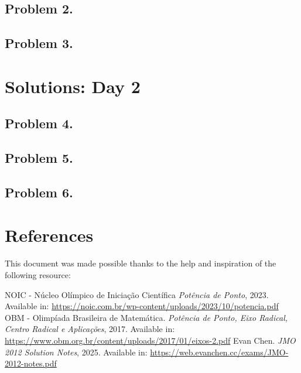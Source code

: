 \documentclass[12pt]{article}
\begin{document}
    \clearpage
    \subsection{Problem 2.}
    \clearpage
    \subsection{Problem 3.}
    \clearpage

  \section{\textsf{Solutions: Day 2}}
    \subsection{Problem 4.}
    \clearpage
    \subsection{Problem 5.}
    \clearpage
    \subsection{Problem 6.}
    \clearpage

    \section{\textsf{References}}
    This document was made possible thanks to the help and inspiration of the following resource:
    \renewcommand{\refname}{\vspace{-2em}}
    \begin{thebibliography}{9}
      NOIC - Núcleo Olímpico de Iniciação Científica
      \textit{Potência de Ponto}, 2023.
      Available in: \href{https://noic.com.br/wp-content/uploads/2023/10/potencia.pdf}
      {https://noic.com.br/wp-content/uploads/2023/10/potencia.pdf}
      OBM - Olimpíada Brasileira de Matemática.
      \textit{Potência de Ponto, Eixo Radical, Centro Radical e Aplicações}, 2017.
      Available in: \href{https://www.obm.org.br/content/uploads/2017/01/eixos-2.pdf}
      {https://www.obm.org.br/content/uploads/2017/01/eixos-2.pdf}
      Evan Chen.
      \textit{JMO 2012 Solution Notes}, 2025.
      Available in: \href{https://web.evanchen.cc/exams/JMO-2012-notes.pdf}
      {https://web.evanchen.cc/exams/JMO-2012-notes.pdf}
    \end{thebibliography}
\end{document}
